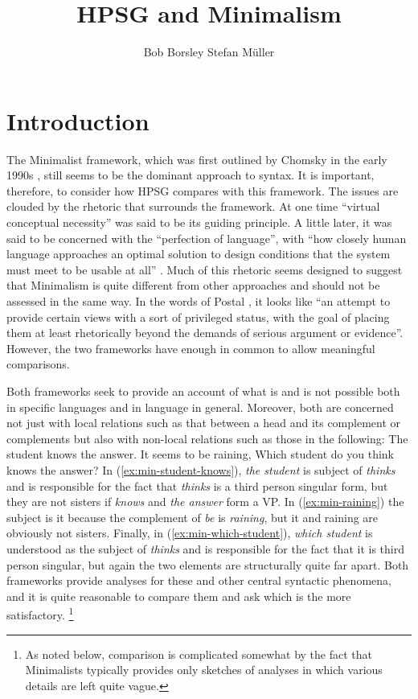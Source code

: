 \documentclass[output=paper]{langsci/langscibook}
\author{%
	Bob Borsley\affiliation{University of Essex}%
	\lastand Stefan Müller\affiliation{Humboldt-Universität zu Berlin}%
}
\title{HPSG and Minimalism}
\begin{document}
\label{chap-minimalism}

\section{Introduction}
\label{sec:min-intro}

The Minimalist framework, which was first outlined by Chomsky in the early 1990s
\citep{Chomsky93b-u,Chomsky95a-u}, still seems to be the dominant approach to syntax. It is
important, therefore, to consider how HPSG compares with this framework. The issues are clouded by
the rhetoric that surrounds the framework. At one time ``virtual conceptual necessity'' was said to be
its guiding principle. A little later, it was said to be concerned with the ``perfection of
language'', with ``how closely human language approaches an optimal solution to design conditions
that the system must meet to be usable at all'' \citet[58]{Chomsky2002a-u}. Much of this rhetoric
seems designed to suggest that Minimalism is quite different from other approaches and should not be
assessed in the same way. In the words of Postal \citet[19]{Postal2003a}, it looks like ``an attempt
to provide certain views with a sort of privileged status, with the goal of placing them at least
rhetorically beyond the demands of serious argument or evidence''. However, the two frameworks have
enough in common to allow meaningful comparisons.


Both frameworks seek to provide an account of what is and is not possible both in specific languages and in language in general. Moreover, both are concerned not just with local relations such as that between a head and its complement or complements but also with non-local relations such as those in the following:
\ea\label{ex:min-student-knows}
The student knows the answer.
\z
\ea\label{ex:min-raining}
It seems to be raining,
\z
\ea\label{ex:min-which-student}
Which student do you think knows the answer? 
\z
In (\ref{ex:min-student-knows}), \textit{the student} is subject of \textit{thinks} and is responsible for the fact that \textit{thinks} is a third person singular form, but they are not sisters if \textit{knows} and \textit{the answer} form a VP. In (\ref{ex:min-raining}) the subject is it because the complement of \textit{be} is \textit{raining}, but it and raining are obviously not sisters. Finally, in (\ref{ex:min-which-student}), \textit{which student} is understood as the subject of \textit{thinks} and is responsible for the fact that it is third person singular, but again the two elements are structurally quite far apart. Both frameworks provide analyses for these and other central syntactic phenomena, and it is quite reasonable to compare them and ask which is the more satisfactory.%
	\footnote{As noted below, comparison is complicated somewhat by the fact that Minimalists typically provides only sketches of analyses in which various details are left quite vague.}%
\end{document}
